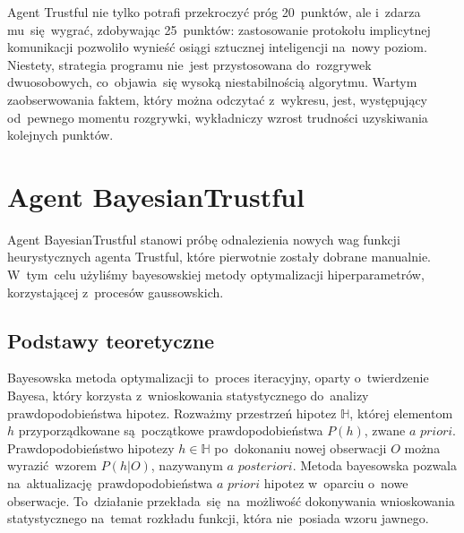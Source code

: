 \documentclass[declaration,shortabstract,inz]{iithesis}
\begin{document}
Agent Trustful nie tylko potrafi przekroczyć próg 20~punktów, ale i~zdarza mu~się~wygrać, zdobywając 25~punktów: zastosowanie protokołu implicytnej komunikacji pozwoliło wynieść osiągi sztucznej inteligencji na~nowy poziom. Niestety, strategia programu nie~jest przystosowana do~rozgrywek dwuosobowych, co~objawia~się wysoką niestabilnością algorytmu. Wartym zaobserwowania faktem, który można odczytać z~wykresu, jest, występujący od~pewnego momentu rozgrywki, wykładniczy wzrost trudności uzyskiwania kolejnych punktów.

\section{Agent BayesianTrustful}

Agent BayesianTrustful stanowi próbę odnalezienia nowych wag funkcji heurystycznych agenta Trustful, które pierwotnie zostały dobrane manualnie. W~tym~celu użyliśmy bayesowskiej metody optymalizacji hiperparametrów, korzystającej z~procesów gaussowskich.

\subsection*{Podstawy teoretyczne}

Bayesowska metoda optymalizacji to~proces iteracyjny, oparty o~twierdzenie Bayesa, który korzysta z~wnioskowania statystycznego do~analizy prawdopodobieństwa hipotez. Rozważmy przestrzeń hipotez $\mathbb{H}$, której elementom $h$ przyporządkowane są~początkowe prawdopodobieństwa $P(h)$, zwane $\textit{a priori}$. Prawdopodobieństwo hipotezy $h\in\mathbb{H}$ po~dokonaniu nowej obserwacji $O$ można wyrazić wzorem $P(h|O)$, nazywanym $\textit{a posteriori}$. Metoda bayesowska pozwala na~aktualizację prawdopodobieństwa $\textit{a priori}$ hipotez w~oparciu o~nowe obserwacje. To~działanie przekłada~się~na~możliwość dokonywania wnioskowania statystycznego na~temat rozkładu funkcji, która nie~posiada wzoru jawnego.
\end{document}
